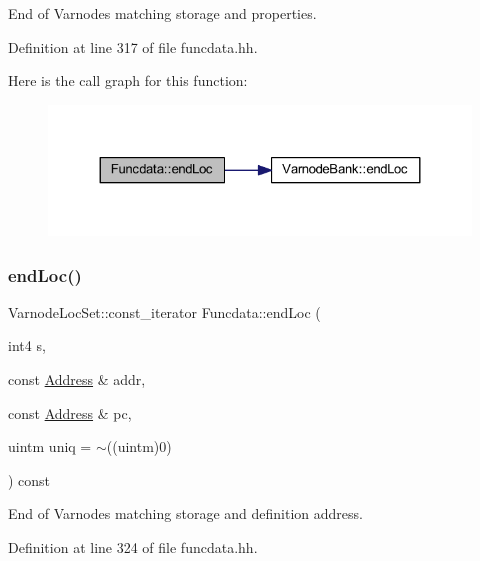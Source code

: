 End of Varnodes matching storage and properties. 



Definition at line 317 of file funcdata.\+hh.

Here is the call graph for this function\+:
\nopagebreak
\begin{figure}[H]
\begin{center}
\leavevmode
\includegraphics[width=324pt]{class_funcdata_a9b418941dce53af9e8ac8dcbd453a44f_cgraph}
\end{center}
\end{figure}
\mbox{\label{class_funcdata_addfc7faf2c1793283d70d16a2313416e}} 
\subsubsection{\texorpdfstring{endLoc()}{endLoc()}\hspace{0.1cm}{\footnotesize\ttfamily [6/6]}}
{\footnotesize\ttfamily Varnode\+Loc\+Set\+::const\+\_\+iterator Funcdata\+::end\+Loc (\begin{DoxyParamCaption}\item[{int4}]{s,  }\item[{const \mbox{\hyperlink{class_address}{Address}} \&}]{addr,  }\item[{const \mbox{\hyperlink{class_address}{Address}} \&}]{pc,  }\item[{uintm}]{uniq = {\ttfamily $\sim$((uintm)0)} }\end{DoxyParamCaption}) const\hspace{0.3cm}{\ttfamily [inline]}}



End of Varnodes matching storage and definition address. 



Definition at line 324 of file funcdata.\+hh.

